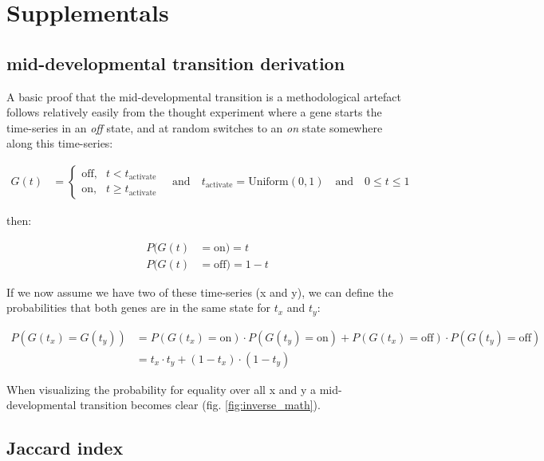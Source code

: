 \section{Supplementals}

\subsection{mid-developmental transition derivation}\label{subsection:middevelopmenttransition}

A basic proof that the mid-developmental transition is a methodological artefact follows relatively easily from the thought experiment where a gene starts the time-series in an \textit{off} state, and at random switches to an \textit{on} state somewhere along this time-series:

\begin{align*}    
    G(t) & = \begin{cases} \text{off},& t < t_{\text{activate}} \\ \text{on},& t \geq t_{\text{activate}} \end{cases} \quad \textrm{and} \quad
    t_{\text{activate}} = \text{Uniform}(0, 1) \quad \textrm{and} \quad
    0 \leq t \leq 1
\end{align*}

then:

\begin{align*}
    P(G(t) & = \text{on}) = t \\
    P(G(t) & = \text{off}) = 1 - t
\end{align*}

If we now assume we have two of these time-series (x and y), we can define the probabilities that both genes are in the same state for $t_x$ and $t_y$:

\begin{align*}
    P(G(t_x) = G(t_y)) & = P(G(t_x) = \text{on}) \cdot P(G(t_y) = \text{on}) + P(G(t_x) = \text{off}) \cdot P(G(t_y) = \text{off}) \\
    & = t_x \cdot t_y + (1 - t_x) \cdot (1-t_y)
\end{align*}

When visualizing the probability for equality over all x and y a mid-developmental transition becomes clear (fig. \ref{fig:inverse_math}).

\subsection{Jaccard index}\label{subsection:flypeaks}

